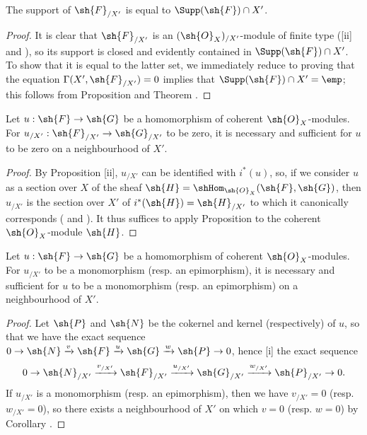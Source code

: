 \begin{corollary}[10.8.12]
\label{I.10.8.12}
The support of $\sh{F}_{/X'}$ is equal to $\Supp(\sh{F})\cap X'$.
\end{corollary}

\begin{proof}
It is clear that $\sh{F}_{/X'}$ is an $(\sh{O}_X)_{/X'}$-module of finite type ([ii] and ),
so its support is closed  and evidently contained in $\Supp(\sh{F})\cap X'$.
To show that it is equal to the latter set, we immediately reduce to proving that the equation $\Gamma(X',\sh{F}_{/X'})=0$ implies that $\Supp(\sh{F})\cap X'=\emp$; this follows from Proposition  and Theorem .
\end{proof}

\begin{corollary}[10.8.13]
\label{I.10.8.13}
Let $u:\sh{F}\to\sh{G}$ be a homomorphism of coherent $\sh{O}_X$-modules.
For $u_{/X'}:\sh{F}_{/X'}\to\sh{G}_{/X'}$ to be zero, it is necessary and sufficient for $u$ to be zero on a neighbourhood of $X'$.
\end{corollary}

\begin{proof}
By Proposition [ii], $u_{/X'}$ can be identified with $i^*(u)$, so, if we consider $u$ as a section over $X$ of the sheaf $\sh{H}=\shHom_{\sh{O}_X}(\sh{F},\sh{G})$, then $u_{/X'}$ is the section over $X'$ of $i^*(\sh{H})=\sh{H}_{/X'}$ to which it canonically corresponds ( and ).
It thus suffices to apply Proposition  to the coherent $\sh{O}_X$-module $\sh{H}$.
\end{proof}

\begin{corollary}[10.8.14]
\label{I.10.8.14}
Let $u:\sh{F}\to\sh{G}$ be a homomorphism of coherent $\sh{O}_X$-modules.
For $u_{/X'}$ to be a monomorphism (resp. an epimorphism), it is necessary and sufficient for $u$ to be a monomorphism (resp. an epimorphism) on a neighbourhood of $X'$.
\end{corollary}

\begin{proof}
Let $\sh{P}$ and $\sh{N}$ be the cokernel and kernel (respectively) of $u$, so that we have the exact sequence $0\to\sh{N}\xrightarrow{v}\sh{F}\xrightarrow{u}\sh{G}\xrightarrow{w}\sh{P}\to 0$, hence [i] the exact sequence
\[
  0\to\sh{N}_{/X'}\xrightarrow{v_{/X'}}\sh{F}_{/X'}\xrightarrow{u_{/X'}}\sh{G}_{/X'}\xrightarrow{w_{/X'}}\sh{P}_{/X'}\to 0.
\]
If $u_{/X'}$ is a monomorphism (resp. an epimorphism), then we have $v_{/X'}=0$ (resp. $w_{/X'}=0$), so there exists a neighbourhood of $X'$ on which $v=0$ (resp. $w=0$) by Corollary .
\end{proof}

